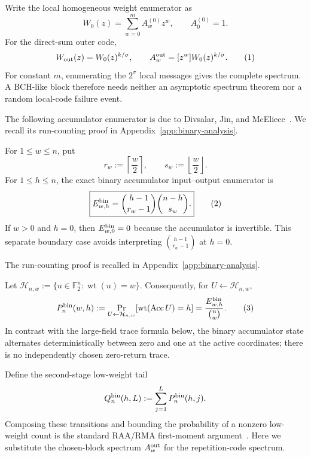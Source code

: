 \documentclass[runningheads,envcountsame,envcountsect]{llncs}
\newcommand{\F}{\mathbb F}
\newcommand{\wt}{\operatorname{wt}}
\newcommand{\Acc}{\operatorname{Acc}}
\newcommand{\Prb}{\Pr}
\newcommand{\eqnumlabel}[1]{%
  \refstepcounter{equation}\tag{\theequation}\label{#1}%
}
\begin{document}
Write the local homogeneous weight enumerator as
\[
    W_0(z)=\sum_{w=0}^{m}A_w^{(0)}z^w,
    \qquad A_0^{(0)}=1.
\]
For the direct-sum outer code,
\[
    W_{\rm out}(z)=W_0(z)^{k/\sigma},
    \qquad
    A_w^{\rm out}=[z^w]W_0(z)^{k/\sigma}.
    \eqnumlabel{eq:B1}
\]
For constant $m$, enumerating the $2^\sigma$ local messages gives the complete
spectrum.  A BCH-like block therefore needs neither an asymptotic spectrum
theorem nor a random local-code failure event.

The following accumulator enumerator is due to Divsalar, Jin, and
McEliece~\cite{divsalar98}.  We recall its run-counting proof in Appendix~\ref{app:binary-analysis}.

\begin{lemma}
\label{lem:binary-transition}
For $1\le w\le n$, put
\[
    r_w:=\left\lceil\frac w2\right\rceil,
    \qquad
    s_w:=\left\lfloor\frac w2\right\rfloor.
\]
For $1\le h\le n$, the exact binary accumulator input--output enumerator is
\[
    \boxed{
    E^{\rm bin}_{w,h}
      =
    \binom{h-1}{r_w-1}
    \binom{n-h}{s_w}.
    }
    \eqnumlabel{eq:B2}
\]
If $w>0$ and $h=0$, then $E^{\rm bin}_{w,0}=0$ because the accumulator is
invertible.  This separate boundary case avoids interpreting
$\binom{h-1}{r_w-1}$ at $h=0$.
\end{lemma}

The run-counting proof is recalled in Appendix~\ref{app:binary-analysis}.


Let $\mathcal H_{n,w}:=\{u\in\F_2^n:\wt(u)=w\}$.  Consequently, for
$U\gets\mathcal H_{n,w}$,
\[
    P_n^{\rm bin}(w,h)
      :=
    \Prb_{U\gets\mathcal H_{n,w}}[\wt(\Acc U)=h]
      =
    \frac{E^{\rm bin}_{w,h}}{\binom{n}{w}}.
    \eqnumlabel{eq:B3}
\]
In contrast with the large-field trace formula below, the binary accumulator
state alternates deterministically between zero and one at the active
coordinates; there is no independently chosen zero-return trace.

Define the second-stage low-weight tail
\[
    Q_n^{\rm bin}(h,L)
      :=
    \sum_{j=1}^{L}P_n^{\rm bin}(h,j).
\]
Composing these transitions and bounding the probability of a nonzero
low-weight count is the standard RAA/RMA first-moment
argument~\cite{bms09,kliewer08}.  Here we substitute the chosen-block spectrum
$A_w^{\rm out}$ for the repetition-code spectrum.
\end{document}
